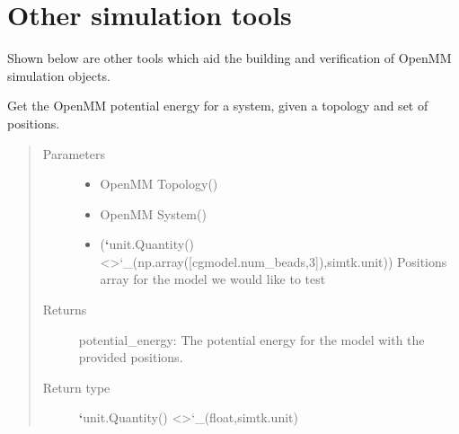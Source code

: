 \documentclass[letterpaper,12pt,english,openany,oneside]{sphinxmanual}
\begin{document}
\section{Other simulation tools}
\label{\detokenize{simulation:other-simulation-tools}}
Shown below are other tools which aid the building and verification of OpenMM simulation objects.

\label{\detokenize{simulation:module-simulation.tools}}

\begin{fulllineitems}
\label{\detokenize{simulation:simulation.tools.get_mm_energy}}
Get the OpenMM potential energy for a system, given a topology and set of positions.
\begin{quote}\begin{description}
\item[{Parameters}] \leavevmode\begin{itemize}
\item {} 
 \textendash{} OpenMM Topology()

\item {} 
 \textendash{} OpenMM System()

\item {} 
 ({\color{red}\bfseries{}{}`}unit.Quantity() \textless{}\textgreater{}{}`\_(np.array({[}cgmodel.num\_beads,3{]}),simtk.unit)) \textendash{} Positions array for the model we would like to test

\end{itemize}

\item[{Returns}] \leavevmode
potential\_energy: The potential energy for the model with the provided positions.

\item[{Return type}] \leavevmode
{\color{red}\bfseries{}{}`}unit.Quantity() \textless{}\textgreater{}{}`\_(float,simtk.unit)


\end{description}
\end{quote}
\end{fulllineitems}
\end{document}
